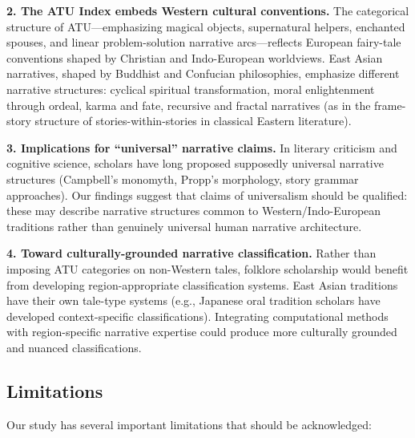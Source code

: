 \documentclass{article}
\begin{document}
\textbf{2. The ATU Index embeds Western cultural conventions.} The categorical structure of ATU---emphasizing magical objects, supernatural helpers, enchanted spouses, and linear problem-solution narrative arcs---reflects European fairy-tale conventions shaped by Christian and Indo-European worldviews. East Asian narratives, shaped by Buddhist and Confucian philosophies, emphasize different narrative structures: cyclical spiritual transformation, moral enlightenment through ordeal, karma and fate, recursive and fractal narratives (as in the frame-story structure of stories-within-stories in classical Eastern literature).

\textbf{3. Implications for ``universal'' narrative claims.} In literary criticism and cognitive science, scholars have long proposed supposedly universal narrative structures (Campbell's monomyth, Propp's morphology, story grammar approaches). Our findings suggest that claims of universalism should be qualified: these may describe narrative structures common to Western/Indo-European traditions rather than genuinely universal human narrative architecture.

\textbf{4. Toward culturally-grounded narrative classification.} Rather than imposing ATU categories on non-Western tales, folklore scholarship would benefit from developing region-appropriate classification systems. East Asian traditions have their own tale-type systems (e.g., Japanese oral tradition scholars have developed context-specific classifications). Integrating computational methods with region-specific narrative expertise could produce more culturally grounded and nuanced classifications.

\subsection{Limitations}

Our study has several important limitations that should be acknowledged:
\end{document}
